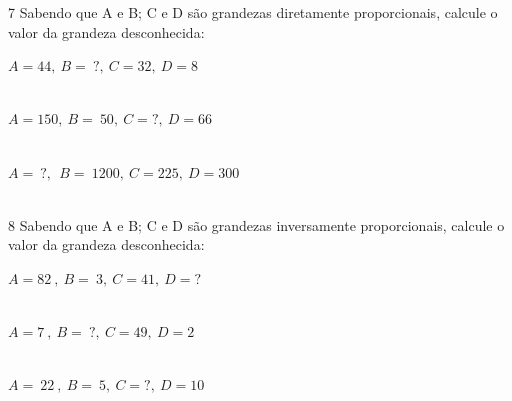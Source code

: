 \num{7} Sabendo que A e B; C e D são grandezas diretamente proporcionais,
calcule o valor da grandeza desconhecida:

\begin{escolha}
\item $A = 44,\ B = \ ?,\ C = 32,\ D = 8$ \\  
 \\
\item $A = 150,\ B = \ 50,\ C = ?,\ D = 66$ \\
 \\
\item $A = \ ?,\ \ B = \ 1200,\ C = 225,\ D = 300$ \\
 \\
\end{escolha}

\num{8} Sabendo que A e B; C e D são grandezas inversamente proporcionais,
calcule o valor da grandeza desconhecida:

\begin{escolha}
\item $A = 82\ ,\ B = \ 3,\ C = 41,\ D = ?$ \\ 
 \\
\item $A = 7\ ,\ B = \ ?,\ C = 49,\ D = 2$ \\
 \\
\item $A = \ 22\ ,\ B = \ 5,\ C = ?,\ D = 10$ \\
  \\
\end{escolha}


